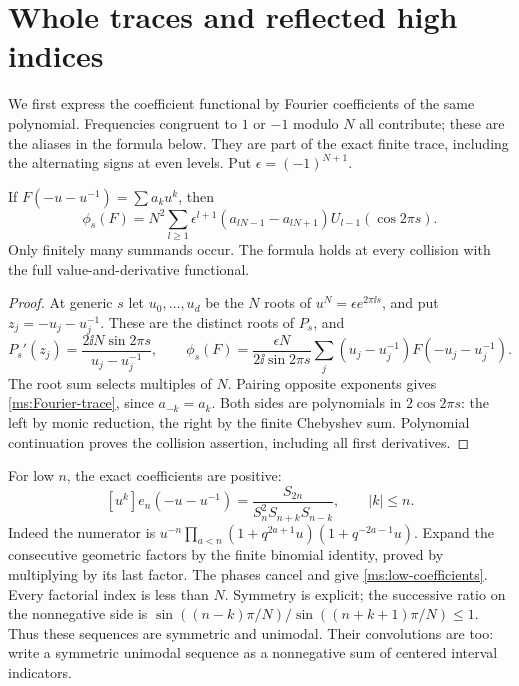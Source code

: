 \section{Whole traces and reflected high indices}\label{ms:fourier}
We first express the coefficient functional by Fourier coefficients
of the same polynomial. Frequencies congruent to $1$ or $-1$ modulo
$N$ all contribute; these are the aliases in the formula below.
They are part of the exact finite trace, including the alternating
signs at even levels. Put $\epsilon=(-1)^{N+1}$.

\begin{lemma}\label{ms:Fourier}
If $F(-u-u^{-1})=\sum a_k u^k$, then
\begin{equation}\label{ms:Fourier-trace}
 \phi_s(F)=N^2\sum_{l\ge1}\epsilon^{l+1}
    (a_{lN-1}-a_{lN+1})U_{l-1}(\cos2\pi s).
\end{equation}
Only finitely many summands occur. The formula holds at every
collision with the full value-and-derivative functional.
\end{lemma}
\begin{proof}
At generic $s$ let $u_0,\ldots,u_d$ be the $N$ roots of
$u^N=\epsilon e^{2\pi\ii s}$, and put
$z_j=-u_j-u_j^{-1}$. These are the distinct roots of $P_s$, and
\[
 P_s'(z_j)=\frac{2\ii N\sin2\pi s}{u_j-u_j^{-1}},\qquad
 \phi_s(F)=\frac{\epsilon N}{2\ii\sin2\pi s}
       \sum_j(u_j-u_j^{-1})F(-u_j-u_j^{-1}).
\]
The root sum selects multiples of $N$. Pairing opposite exponents
gives \eqref{ms:Fourier-trace}, since $a_{-k}=a_k$. Both sides are
polynomials in $2\cos2\pi s$: the left by monic reduction, the right
by the finite Chebyshev sum. Polynomial continuation proves the
collision assertion, including all first derivatives.
\end{proof}

For low $n$, the exact coefficients are positive:
\begin{equation}\label{ms:low-coefficients}
 [u^k]e_n(-u-u^{-1})=
 \frac{S_{2n}}{S_n^2S_{n+k}S_{n-k}},\qquad |k|\le n.
\end{equation}
Indeed the numerator is
$u^{-n}\prod_{a<n}(1+q^{2a+1}u)(1+q^{-2a-1}u)$.
Expand the consecutive geometric factors by the finite binomial
identity, proved by multiplying by its last factor. The phases
cancel and give \eqref{ms:low-coefficients}. Every factorial index
is less than $N$. Symmetry is explicit; the successive ratio on the
nonnegative side is
$\sin((n-k)\pi/N)/\sin((n+k+1)\pi/N)\le1$.
Thus these sequences are symmetric and unimodal. Their convolutions
are too: write a symmetric unimodal sequence as a nonnegative sum
of centered interval indicators.

